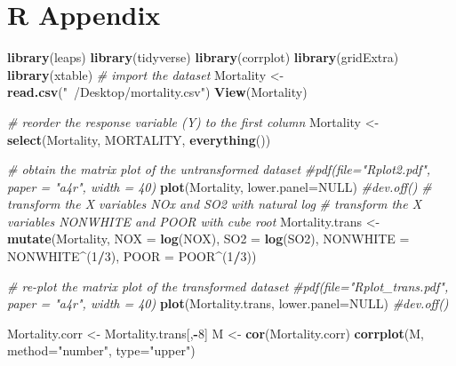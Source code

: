 \documentclass[]{article}
\newenvironment{Shaded}{\begin{snugshade}}{\end{snugshade}}
\newcommand{\KeywordTok}[1]{\textcolor[rgb]{0.13,0.29,0.53}{\textbf{#1}}}
\newcommand{\DataTypeTok}[1]{\textcolor[rgb]{0.13,0.29,0.53}{#1}}
\newcommand{\DecValTok}[1]{\textcolor[rgb]{0.00,0.00,0.81}{#1}}
\newcommand{\StringTok}[1]{\textcolor[rgb]{0.31,0.60,0.02}{#1}}
\newcommand{\CommentTok}[1]{\textcolor[rgb]{0.56,0.35,0.01}{\textit{#1}}}
\newcommand{\OtherTok}[1]{\textcolor[rgb]{0.56,0.35,0.01}{#1}}
\newcommand{\OperatorTok}[1]{\textcolor[rgb]{0.81,0.36,0.00}{\textbf{#1}}}
\newcommand{\NormalTok}[1]{#1}
\begin{document}
\section{R Appendix}\label{r-appendix}

\begin{Shaded}
\begin{Highlighting}[]
\KeywordTok{library}\NormalTok{(leaps)}
\KeywordTok{library}\NormalTok{(tidyverse)}
\KeywordTok{library}\NormalTok{(corrplot)}
\KeywordTok{library}\NormalTok{(gridExtra)}
\KeywordTok{library}\NormalTok{(xtable)}
\CommentTok{# import the dataset }
\NormalTok{Mortality <-}\StringTok{ }\KeywordTok{read.csv}\NormalTok{(}\StringTok{"~/Desktop/mortality.csv"}\NormalTok{)}
\KeywordTok{View}\NormalTok{(Mortality)}

\CommentTok{# reorder the response variable (Y) to the first column}
\NormalTok{Mortality <-}\StringTok{ }\KeywordTok{select}\NormalTok{(Mortality, MORTALITY, }\KeywordTok{everything}\NormalTok{())}

\CommentTok{# obtain the matrix plot of the untransformed dataset}
\CommentTok{#pdf(file="Rplot2.pdf", paper = "a4r", width = 40)}
\KeywordTok{plot}\NormalTok{(Mortality, }\DataTypeTok{lower.panel=}\OtherTok{NULL}\NormalTok{)}
\CommentTok{#dev.off()}
\CommentTok{# transform the X variables NOx and SO2 with natural log}
\CommentTok{# transform the X variables NONWHITE and POOR with cube root}
\NormalTok{Mortality.trans <-}\StringTok{ }\KeywordTok{mutate}\NormalTok{(Mortality, }\DataTypeTok{NOX =} \KeywordTok{log}\NormalTok{(NOX), }\DataTypeTok{SO2 =} \KeywordTok{log}\NormalTok{(SO2),}
                         \DataTypeTok{NONWHITE =}\NormalTok{ NONWHITE}\OperatorTok{^}\NormalTok{(}\DecValTok{1}\OperatorTok{/}\DecValTok{3}\NormalTok{), }\DataTypeTok{POOR =}\NormalTok{ POOR}\OperatorTok{^}\NormalTok{(}\DecValTok{1}\OperatorTok{/}\DecValTok{3}\NormalTok{))}

\CommentTok{# re-plot the matrix plot of the transformed dataset}
\CommentTok{#pdf(file="Rplot_trans.pdf", paper = "a4r", width = 40)}
\KeywordTok{plot}\NormalTok{(Mortality.trans, }\DataTypeTok{lower.panel=}\OtherTok{NULL}\NormalTok{)}
\CommentTok{#dev.off()}

\NormalTok{Mortality.corr <-}\StringTok{ }\NormalTok{Mortality.trans[,}\OperatorTok{-}\DecValTok{8}\NormalTok{]}
\NormalTok{M <-}\StringTok{ }\KeywordTok{cor}\NormalTok{(Mortality.corr)}
\KeywordTok{corrplot}\NormalTok{(M, }\DataTypeTok{method=}\StringTok{"number"}\NormalTok{, }\DataTypeTok{type=}\StringTok{"upper"}\NormalTok{)}


\end{Highlighting}
\end{Shaded}
\end{document}

